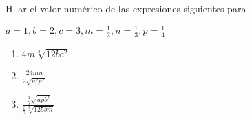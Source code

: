 \begin{frame}

Hllar el valor numérico de las expresiones siguientes para

$a=1, b=2, c=3, m=\frac{1}{2}, n=\frac{1}{3}, p=\frac{1}{4}$

\begin{enumerate}
\item $4m \sqrt[3]{12bc^2}$
\item $\frac{24mn}{2 \sqrt{n^2p^2}}$
\item $\frac{\frac{3}{5} \sqrt{apb^2} }{\frac{3}{2}\sqrt[3]{125bm} }$
\end{enumerate}

\end{frame}

